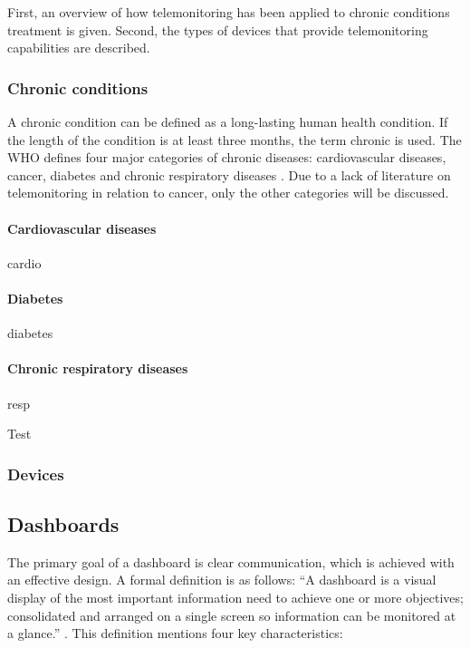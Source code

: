     First, an overview of how telemonitoring has been applied to chronic conditions treatment is given. Second, the types of devices that provide telemonitoring capabilities are described.

        \subsubsection{Chronic conditions}

        A chronic condition can be defined as a long-lasting human health condition. If the length of the condition is at least three months, the term chronic is used. The WHO defines four major categories of chronic diseases: cardiovascular diseases, cancer, diabetes and chronic respiratory diseases \cite{world2017noncommunicable}. Due to a lack of literature on telemonitoring in relation to cancer, only the other categories will be discussed.

        \paragraph{Cardiovascular diseases} cardio

        \paragraph{Diabetes} diabetes

        \paragraph{Chronic respiratory diseases} resp

        \noindent Test


        \subsubsection{Devices}


    \subsection{Dashboards} \label{2_dashboards}

    The primary goal of a dashboard is clear communication, which is achieved with an effective design. A formal definition is as follows: ``A dashboard is a visual display of the most important information need to achieve one or more objectives; consolidated and arranged on a single screen so information can be monitored at a glance.'' \cite{dashboard}. This definition mentions four key characteristics:

